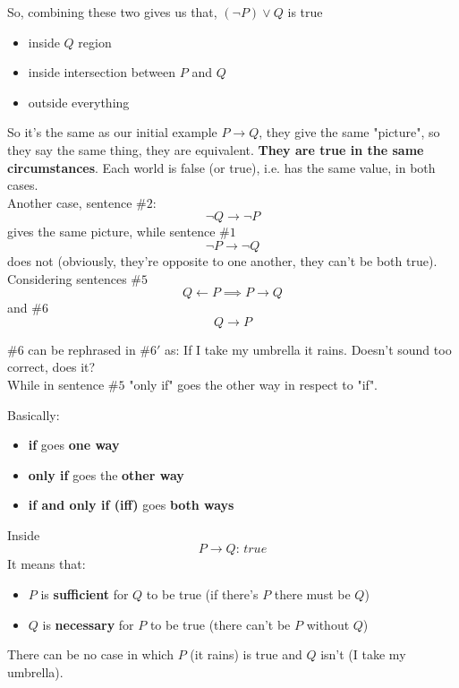 \documentclass[11pt]{article}
\begin{document}
	So, combining these two gives us that, $(\neg P) \vee Q$ is true
	\begin{itemize}
		\item inside $Q$ region
		\item inside intersection between $P$ and $Q$
		\item outside everything
	\end{itemize}
	
	So it's the same as our initial example $P \rightarrow Q$, they give the same "picture", so they say the same thing, they are equivalent. \textbf{They are true in the same circumstances}. Each world is false (or true), i.e. has the same value, in both cases.\\
	
	Another case, sentence $\#2$:
	$$ \neg Q \rightarrow \neg P$$
	gives the same picture, while sentence $\# 1$
	$$ \neg P \rightarrow \neg Q$$
	does not (obviously, they're opposite to one another, they can't be both true).\\
	
	Considering sentences  $\#5$ 
	$$ Q \leftarrow P \implies P \rightarrow Q $$
	and $\#6$
	$$ Q \rightarrow P$$
	
	$\# 6$ can be rephrased in $\# 6'$ as: If I take my umbrella it rains. Doesn't sound too correct, does it?\\
	While in sentence $\#5$ "only if" goes the other way in respect to "if".\\
	
	\newpage
	
	Basically:
	\begin{itemize}
		\item \textbf{if} goes \textbf{one way} 
		\item \textbf{only if} goes the \textbf{other way} 
		\item \textbf{if and only if (iff)} goes \textbf{both ways}
	\end{itemize}
	
	Inside
	$$ P \rightarrow Q: \, true$$
	It means that: 
	\begin{itemize}
		\item $P$ is \textbf{sufficient} for $Q$ to be true (if there's $P$ there must be $Q$)
		\item $Q$ is \textbf{necessary} for $P$ to be true (there can't be $P$ without $Q$)
	\end{itemize}
	There can be no case in which $P$ (it rains) is true and $Q$ isn't (I take my umbrella).\\
	
\end{document}
